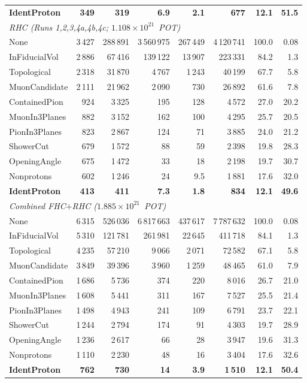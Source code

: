 \documentclass[11pt,a4paper]{article}
\begin{document}
\begin{table}[H]
\begin{tabular}{lrrrrrrr}
    \textbf{IdentProton} & \textbf{349} & \textbf{319} & \textbf{6.9} & \textbf{2.1} & \textbf{677} & \textbf{12.1} & \textbf{51.5} \\
    \multicolumn{8}{l}{\textit{RHC (Runs 1,2,3,4a,4b,4c; $1.108\times10^{21}$~POT)}} \\
    None             & 3\,427 & 288\,891 & 3\,560\,975 & 267\,449 & 4\,120\,741 & 100.0 & 0.08 \\
    InFiducialVol    & 2\,886 & 67\,416 & 139\,122 & 13\,907 & 223\,331 & 84.2 & 1.3 \\
    Topological      & 2\,318 & 31\,870 & 4\,767 & 1\,243 & 40\,199 & 67.7 & 5.8 \\
    MuonCandidate    & 2\,111 & 21\,962 & 2\,090 & 730 & 26\,892 & 61.6 & 7.8 \\
    ContainedPion    & 924 & 3\,325 & 195 & 128 & 4\,572 & 27.0 & 20.2 \\
    MuonIn3Planes    & 882 & 3\,152 & 162 & 100 & 4\,295 & 25.7 & 20.5 \\
    PionIn3Planes    & 823 & 2\,867 & 124 & 71 & 3\,885 & 24.0 & 21.2 \\
    ShowerCut        & 679 & 1\,572 & 88 & 59 & 2\,398 & 19.8 & 28.3 \\
    OpeningAngle     & 675 & 1\,472 & 33 & 18 & 2\,198 & 19.7 & 30.7 \\
    Nonprotons       & 602 & 1\,246 & 24 & 9.5 & 1\,881 & 17.6 & 32.0 \\
    \textbf{IdentProton} & \textbf{413} & \textbf{411} & \textbf{7.3} & \textbf{1.8} & \textbf{834} & \textbf{12.1} & \textbf{49.6} \\
    \multicolumn{8}{l}{\textit{Combined FHC$+$RHC ($1.885\times10^{21}$~POT)}} \\
    None             & 6\,315 & 526\,036 & 6\,817\,663 & 437\,617 & 7\,787\,632 & 100.0 & 0.08 \\
    InFiducialVol    & 5\,310 & 121\,781 & 261\,981 & 22\,645 & 411\,718 & 84.1 & 1.3 \\
    Topological      & 4\,235 & 57\,210 & 9\,066 & 2\,071 & 72\,582 & 67.1 & 5.8 \\
    MuonCandidate    & 3\,849 & 39\,396 & 3\,960 & 1\,259 & 48\,465 & 61.0 & 7.9 \\
    ContainedPion    & 1\,686 & 5\,736 & 374 & 220 & 8\,016 & 26.7 & 21.0 \\
    MuonIn3Planes    & 1\,608 & 5\,441 & 311 & 167 & 7\,527 & 25.5 & 21.4 \\
    PionIn3Planes    & 1\,498 & 4\,943 & 241 & 109 & 6\,791 & 23.7 & 22.1 \\
    ShowerCut        & 1\,244 & 2\,794 & 174 & 91 & 4\,303 & 19.7 & 28.9 \\
    OpeningAngle     & 1\,236 & 2\,617 & 66 & 28 & 3\,947 & 19.6 & 31.3 \\
    Nonprotons       & 1\,110 & 2\,230 & 48 & 16 & 3\,404 & 17.6 & 32.6 \\
    \textbf{IdentProton} & \textbf{762} & \textbf{730} & \textbf{14} & \textbf{3.9} & \textbf{1\,510} & \textbf{12.1} & \textbf{50.4} \\
    \bottomrule
  \end{tabular}
\end{table}
\end{document}
